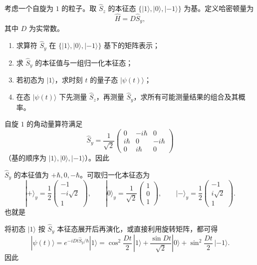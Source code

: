 \begin{question}
考虑一个自旋为 $1$ 的粒子。取 $\hat S_z$ 的本征态 $\{|1\rangle,|0\rangle,|-1\rangle\}$ 为基。定义哈密顿量为
\[
\hat H=D\hat S_y,
\]
其中 $D$ 为实常数。

\begin{enumerate}[label=(\arabic*),leftmargin=2.5em]
  \item 求算符 $\hat S_y$ 在 $\{|1\rangle,|0\rangle,|-1\rangle\}$ 基下的矩阵表示；
  \item 求 $\hat S_y$ 的本征值与一组归一化本征态；
  \item 若初态为 $|1\rangle$，求时刻 $t$ 的量子态 $|\psi(t)\rangle$；
  \item 在态 $|\psi(t)\rangle$ 下先测量 $\hat S_z$，再测量 $\hat S_y$，求所有可能测量结果的组合及其概率。
\end{enumerate}

\begin{solution}
自旋 $1$ 的角动量算符满足
\[
\hat S_y=\frac{1}{\sqrt2}
\begin{pmatrix}
0&-i\hbar&0\\
i\hbar&0&-i\hbar\\
0&i\hbar&0
\end{pmatrix}
\]
（基的顺序为 $|1\rangle,|0\rangle,|-1\rangle$）。因此

$\hat S_y$ 的本征值为 $+\hbar,0,-\hbar$。可取归一化本征态为
\[
|+\rangle_y=\frac{1}{2}
\begin{pmatrix}-1\\-i\sqrt2\\1\end{pmatrix},
\qquad
|0\rangle_y=\frac{1}{\sqrt2}
\begin{pmatrix}1\\0\\1\end{pmatrix},
\qquad
|-\rangle_y=\frac{1}{2}
\begin{pmatrix}-1\\i\sqrt2\\1\end{pmatrix}.
\]
也就是

将初态 $|1\rangle$ 按 $\hat S_y$ 本征态展开后再演化，或直接利用旋转矩阵，都可得
\[
|\psi(t)\rangle=e^{-iDt\hat S_y/\hbar}|1\rangle
=\cos^2\frac{Dt}{2}\,|1\rangle+\frac{\sin Dt}{\sqrt2}|0\rangle+\sin^2\frac{Dt}{2}\,|-1\rangle.
\]
因此


\end{solution}
\end{question}
